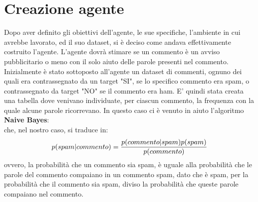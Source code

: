\documentclass{report}
\begin{document}
    \chapter{Creazione agente}
    Dopo aver definito gli obiettivi dell'agente, le sue specifiche, l'ambiente in cui avrebbe lavorato, ed il suo dataset, si è deciso come andava effettivamente costruito l'agente.
    L'agente dovrà stimare se un commento è un avviso pubblicitario o meno con il solo aiuto delle parole presenti nel commento. Inizialmente è stato sottoposto all'agente 
    un dataset di commenti, ognuno dei quali era contrassegnato da un target "SI", se lo specifico commento era spam, o contrassegnato da target "NO" se il commento era ham.
    E' quindi stata creata una tabella dove venivano individuate, per ciascun commento,
    la frequenza con la quale alcune parole ricorrevano. In questo caso ci è venuto in aiuto l'algoritmo {\bfseries Naive Bayes}:
    \newline
    \begin{equation}\label{bho}
    \end{equation}
    \newline
    che, nel nostro caso, si traduce in:
    \newline
    \begin{equation}\label{bho2}
        p(spam|commento) = { p(commento|spam)  p(spam)\over p(commento)}
    \end{equation}
    \newline
    ovvero, la probabilità che un commento sia spam, è uguale alla probabilità che le parole del commento compaiano in un commento spam, dato che è spam, per la probabilità 
    che il commento sia spam, diviso la probabilità che queste parole compaiano nel commento.
\end{document}
